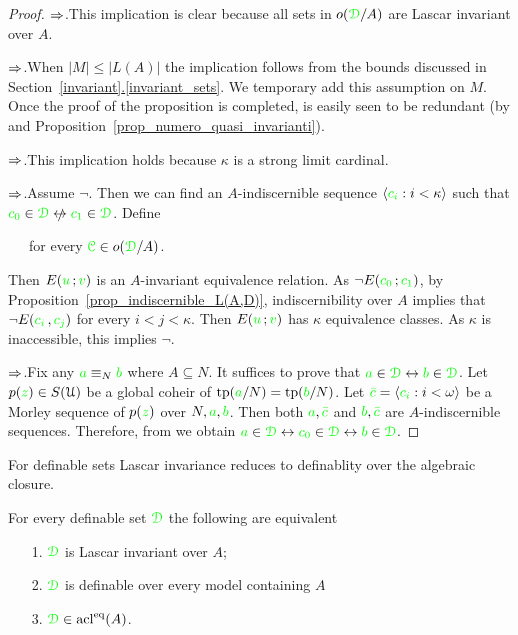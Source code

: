 \documentclass[creche.tex]{subfiles}
\begin{document}
\begin{proof}
  $\Rightarrow$.\quad This implication is clear because all sets in $o({\color{green}\EuScript D}/A)$ are Lascar invariant over $A$. 
  
  $\Rightarrow$.\quad When $|M|\le|L(A)|$ the implication follows from the bounds discussed in Section~\hyperref[invariant_sets]{\ref*{invariant}.\ref*{invariant_sets}}. We temporary add this assumption on $M$. Once the proof of the proposition is completed, is easily seen to be redundant (by  and Proposition~\ref{prop_numero_quasi_invarianti}). 
  
  $\Rightarrow$.\quad This implication holds because $\kappa$ is a strong limit cardinal.

  $\Rightarrow$.\quad Assume $\neg$. Then we can find an  $A\mbox{-}$indiscernible sequence $\langle{\color{green}c_i}:i<\kappa\rangle$ such that ${\gr c_0}\in\grD\niff {\gr c_1}\in\grD$. Define

  \ \ \ for every ${\color{green}\EuScript C}\in o({\color{green}\EuScript D}/A)$.

  Then $E({\color{green} u}\,;{\color{green} v})$ is an $A\mbox{-}$invariant equivalence relation. As $\neg E({\color{green} c_0}\,;{\color{green} c_1})$, by Proposition~\ref{prop_indiscernible_L(A,D)}, indiscernibility over $A$ implies that $\neg E({\color{green} c_i\,},{\color{green} c_j})$ for every $i<j<\kappa$. Then $E({\color{green} u}\,;{\color{green} v})$ has $\kappa$ equivalence classes. As $\kappa$ is inaccessible, this implies $\neg$.

  $\Rightarrow$.\quad Fix any ${\color{green} a}\equiv_N{\color{green} b}$ where $A\subseteq N$. It suffices to prove that ${\color{green} a}\in{\color{green}\EuScript D}\leftrightarrow{\color{green}b}\in{\color{green}\EuScript D}$. Let $p({\color{green} z})\in S(\EuScript U)$ be a global coheir of ${\rm tp}({\color{green} a}/N)={\rm tp}({\color{green} b}/N)$. Let ${\color{green}\bar c}=\langle{\color{green}c_i}:i<\omega\rangle$ be a Morley sequence of $p({\color{green} z})$ over $N,{\color{green} a},{\color{green} b}$. Then both ${\color{green} a},{\color{green}\bar c}$ and ${\color{green} b},{\color{green}\bar c}$ are $A\mbox{-}$indiscernible sequences. Therefore, from  we obtain ${\color{green} a}\in{\color{green}\EuScript D}\leftrightarrow{\color{green}c_0}\in{\color{green}\EuScript D}\leftrightarrow{\color{green}b}\in{\color{green}\EuScript D}$. 
\end{proof}

For definable sets Lascar invariance reduces to definablity over the algebraic closure.

\begin{corollary}\label{coroll_defble_Lascar_inv}
For every definable set ${\color{green}\EuScript D}$ the following are equivalent
  \begin{itemize}
    \item[1.] ${\color{green}\EuScript D}$ is Lascar invariant over $A$;
    \item[2.] ${\color{green}\EuScript D}$ is definable over every model containing $A$
    \item[3.] ${\color{green}\EuScript D}\in\mathop{\rm acl}^{{\rm eq}}(A)$.\QED
  \end{itemize}
\end{corollary}
\end{document}
